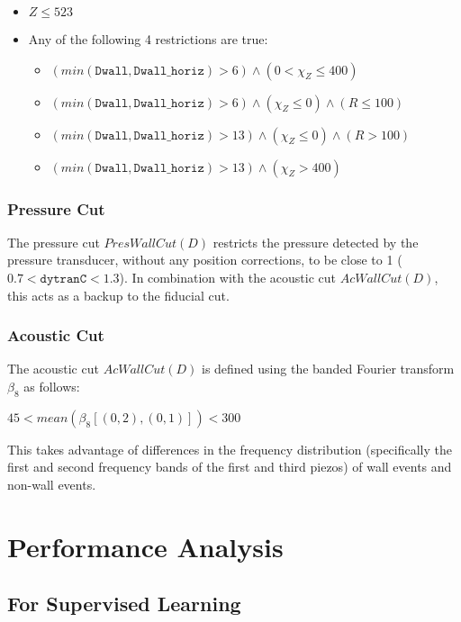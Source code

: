 \documentclass[10pt]{article}
\begin{document}
\begin{itemize}
    \item $Z \leq 523$
    \item Any of the following 4 restrictions are true:
    \begin{itemize}
        \item $(min(\texttt{Dwall}, \texttt{Dwall\_horiz}) > 6) \land (0 < \chi_{Z} \leq 400)$
        \item $(min(\texttt{Dwall}, \texttt{Dwall\_horiz}) > 6) \land (\chi_{Z} \leq 0) \land (R \leq 100)$
        \item $(min(\texttt{Dwall}, \texttt{Dwall\_horiz}) > 13) \land (\chi_{Z} \leq 0) \land (R > 100)$
        \item $(min(\texttt{Dwall}, \texttt{Dwall\_horiz}) > 13) \land (\chi_{Z} > 400)$
    \end{itemize}
\end{itemize}

\subsubsection{Pressure Cut}

The pressure cut $PresWallCut(D)$ restricts the pressure detected by the pressure transducer, without any position corrections, to be close to 1 ($0.7<\texttt{dytranC}<1.3$). In combination with the acoustic cut $AcWallCut(D)$, this acts as a backup to the fiducial cut.

\subsubsection{Acoustic Cut}

The acoustic cut $AcWallCut(D)$ is defined using the banded Fourier transform $\beta_{8}$ as follows:

$45 < mean(\beta_{8}[(0, 2), (0, 1)]) < 300$

This takes advantage of differences in the frequency distribution (specifically the first and second frequency bands of the first and third piezos) of wall events and non-wall events.

\section{Performance Analysis}

\subsection{For Supervised Learning}
\end{document}
